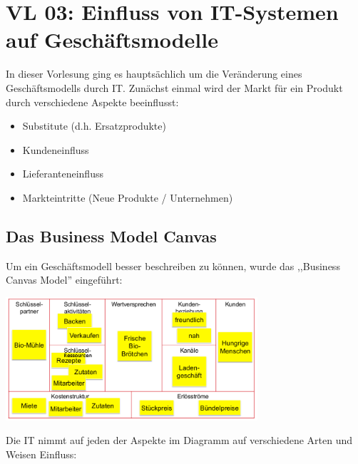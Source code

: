 \newpage
\section{VL 03: Einfluss von IT-Systemen auf Geschäftsmodelle}

In dieser Vorlesung ging es hauptsächlich um die Veränderung eines Geschäftsmodells durch IT. Zunächst einmal wird der Markt für ein Produkt durch verschiedene Aspekte beeinflusst:

\begin{itemize}

    \item Substitute (d.h. Ersatzprodukte)

    \item Kundeneinfluss

    \item Lieferanteneinfluss

    \item Markteintritte (Neue Produkte / Unternehmen)

\end{itemize}

\subsection{Das Business Model Canvas}
    Um ein Geschäftsmodell besser beschreiben zu können, wurde das ,,Business Canvas Model'' eingeführt:

    \begin{center}\includegraphics[width=0.7\textwidth]{BCM.png}\end{center}

    Die IT nimmt auf jeden der Aspekte im Diagramm auf verschiedene Arten und Weisen Einfluss:

